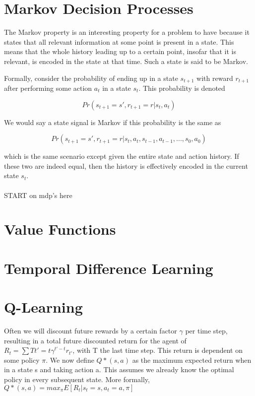 \section{Markov Decision Processes}
The Markov property is an interesting property for a problem to have
because it states that all relevant information at some point
is present in a state.
This means that the whole history leading up to a certain point,
insofar that it is relevant,
is encoded in the state at that time. 
Such a state is said to be Markov.

Formally, consider the probability of ending up in a state $s_{t+1}$
with reward $r_{t+1}$
after performing some action $a_t$
in a state $s_t$.
This probability is denoted

$$Pr(s_{t+1}=s', r_{t+1}=r | s_t, a_t)$$

We would say a state signal is Markov if this probability is the same as

$$Pr(s_{t+1}=s', r_{t+1}=r | s_t, a_t, s_{t-1}, a_{t-1},..., s_0, a_0)$$

which is the same scenario except given the entire state and action history. If these two are indeed equal, then the history is effectively encoded in the current state $s_t$.

\paragraph{}
START on mdp's here

\section{Value Functions}

\section{Temporal Difference Learning}

\section{Q-Learning}
Often we will discount future rewards
by a certain factor $\gamma$ per time step,
resulting in a total future discounted return
for the agent of
$R_t = \sum{T}{t'=t} \gamma^{t'-t}r_{t'}$,
with T the last time step.
This return is dependent on some policy $\pi$.
We now define $Q*(s,a)$ as the maximum expected return
when in a state s and taking action a.
This assumes we already know the optimal policy
in every subsequent state.
More formally,
$Q*(s,a) = max_{\pi}E[R_t|s_t=s, a_t=a, \pi]$


